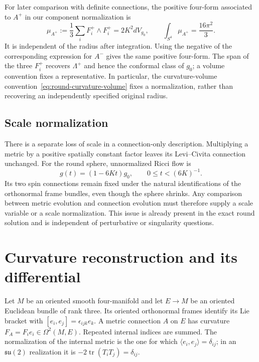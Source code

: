 \documentclass[11pt]{article}
\numberwithin{equation}{section}
\theoremstyle{definition}
\theoremstyle{remark}
\begin{document}
For later comparison with definite connections, the positive four-form
associated to $A^+$ in our component normalization is
\begin{equation}
 \mu_{A^+}:=\frac13\sum_iF_i^+\wedge F_i^+
 =2K^2dV_{g_0},
 \qquad
 \int_{S^4}\mu_{A^+}=\frac{16\pi^2}{3}.
 \label{eq:round-curvature-volume}
\end{equation}
It is independent of the radius after integration.  Using the negative of
the corresponding expression for $A^-$ gives the same positive four-form.
The span of the three $F_i^+$ recovers $\Lambda^+$ and hence the conformal
class of $g_0$; a volume convention fixes a representative.  In particular,
the curvature-volume convention~\eqref{eq:round-curvature-volume} fixes a
normalization, rather than recovering an independently specified original
radius.

\subsection{Scale normalization}
\label{subsec:round-scale-twistor}

There is a separate loss of scale in a connection-only description.
Multiplying a metric by a positive spatially constant factor leaves its
Levi--Civita connection unchanged.  For the round sphere, unnormalized
Ricci flow is
\begin{equation}
 g(t)=(1-6Kt)g_0,\qquad 0\leq t<(6K)^{-1}.
 \label{eq:round-ricci-flow}
\end{equation}
Its two spin connections remain fixed under the natural identifications
of the orthonormal frame bundles, even though the sphere shrinks.  Any
comparison between metric evolution and connection evolution must
therefore supply a scale variable or a scale normalization.  This issue
is already present in the exact round solution and is independent of
perturbative or singularity questions.


\section{Curvature reconstruction and its differential}
\label{rec:section}

Let $M$ be an oriented smooth four-manifold and let $E\to M$ be an
oriented Euclidean bundle of rank three.  Its oriented orthonormal frames
identify its Lie bracket with
$[e_i,e_j]=\epsilon_{ijk}e_k$.  A metric connection $A$ on $E$ has curvature
$F_A=F_i e_i\in\Omega^2(M,E)$.  Repeated internal indices are summed.
The normalization of the internal metric is the one for which
$\langle e_i,e_j\rangle=\delta_{ij}$; in an $\mathfrak{su}(2)$ realization
it is $-2\operatorname{tr}(T_iT_j)=\delta_{ij}$.
\end{document}
